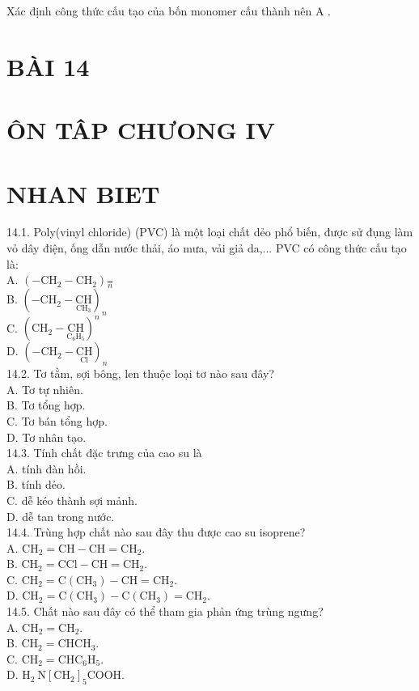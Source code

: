 \documentclass[10pt]{article}
\begin{document}
Xác định công thức cấu tạo của bốn monomer cấu thành nên A .

\section*{BÀI 14}
\section*{ÔN TÂP CHƯONG IV}
\section*{NHAN BIET}
14.1. Poly(vinyl chloride) (PVC) là một loại chất dẻo phổ biến, được sử đụng làm vỏ dây điện, ống dẫn nước thải, áo mưa, vải giả da,... PVC có công thức cấu tạo là:\\
A. $\left(-\mathrm{CH}_{2}-\mathrm{CH}_{2}\right) \frac{}{n}$\\
B. $\left(-\mathrm{CH}_{2}-\underset{\mathrm{CH}_{3}}{\mathrm{CH}}\right)_{n}$\\
C. $\left(\mathrm{CH}_{2}-\underset{\mathrm{C}_{6} \mathrm{H}_{5}}{\mathrm{CH}}\right)^{n}$\\
D. $\left(-\mathrm{CH}_{2}-\underset{\mathrm{Cl}}{\mathrm{CH}}\right)_{n}$\\
14.2. Tơ tằm, sợi bông, len thuộc loại tơ nào sau đây?\\
A. Tơ tự nhiên.\\
B. Tơ tổng hợp.\\
C. Tơ bán tổng hợp.\\
D. Tơ nhân tạo.\\
14.3. Tính chất đặc trưng của cao su là\\
A. tính đàn hồi.\\
B. tính dẻo.\\
C. dễ kéo thành sợi mảnh.\\
D. dễ tan trong nước.\\
14.4. Trùng hợp chất nào sau đây thu được cao su isoprene?\\
A. $\mathrm{CH}_{2}=\mathrm{CH}-\mathrm{CH}=\mathrm{CH}_{2}$.\\
B. $\mathrm{CH}_{2}=\mathrm{CCl}-\mathrm{CH}=\mathrm{CH}_{2}$.\\
C. $\mathrm{CH}_{2}=\mathrm{C}\left(\mathrm{CH}_{3}\right)-\mathrm{CH}=\mathrm{CH}_{2}$.\\
D. $\mathrm{CH}_{2}=\mathrm{C}\left(\mathrm{CH}_{3}\right)-\mathrm{C}\left(\mathrm{CH}_{3}\right)=\mathrm{CH}_{2}$.\\
14.5. Chất nào sau đây có thể tham gia phản ứng trùng ngưng?\\
A. $\mathrm{CH}_{2}=\mathrm{CH}_{2}$.\\
B. $\mathrm{CH}_{2}=\mathrm{CHCH}_{3}$.\\
C. $\mathrm{CH}_{2}=\mathrm{CHC}_{6} \mathrm{H}_{5}$.\\
D. $\mathrm{H}_{2} \mathrm{~N}\left[\mathrm{CH}_{2}\right]_{5} \mathrm{COOH}$.
\end{document}

